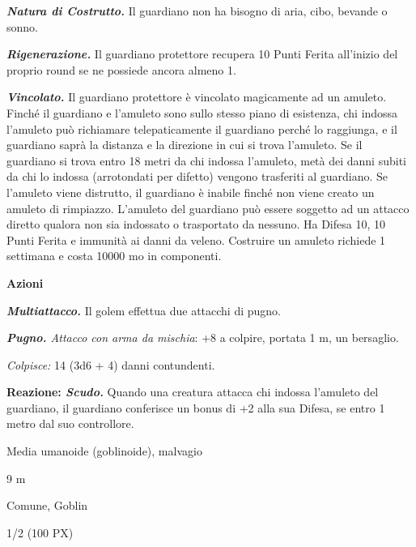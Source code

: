 \begin{multicols}{2}
{\emph{\textbf{Natura di Costrutto.}} Il guardiano non ha bisogno di aria, cibo, bevande o sonno.

\emph{\textbf{Rigenerazione.}} Il guardiano protettore recupera 10 Punti Ferita all'inizio del proprio round se ne possiede ancora almeno 1.

\emph{\textbf{Vincolato.}} Il guardiano protettore è vincolato magicamente ad un amuleto. Finché il guardiano e l'amuleto sono sullo stesso piano di esistenza, chi indossa l'amuleto può richiamare telepaticamente il guardiano perché lo raggiunga, e il guardiano saprà la distanza e la direzione in cui si trova l'amuleto. Se il guardiano si trova entro 18 metri da chi indossa l'amuleto, metà dei danni subiti da chi lo indossa (arrotondati per difetto) vengono trasferiti al guardiano. Se l'amuleto viene distrutto, il guardiano è inabile finché non viene creato un amuleto di rimpiazzo. L'amuleto del guardiano può essere soggetto ad un attacco diretto qualora non sia indossato o trasportato da nessuno. Ha Difesa 10, 10 Punti Ferita e immunità ai danni da veleno. Costruire un amuleto richiede 1 settimana e costa 10000 mo in componenti.

\textbf{Azioni}

\emph{\textbf{Multiattacco.}} Il golem effettua due attacchi di pugno.

\emph{\textbf{Pugno.} Attacco con arma da mischia}: +8 a colpire, portata 1 m, un bersaglio.

\emph{Colpisce:} 14 (3d6 + 4) danni contundenti.

\textbf{Reazione: \emph{Scudo.}} Quando una creatura attacca chi indossa l'amuleto del guardiano, il guardiano conferisce un bonus di +2 alla sua Difesa, se entro 1 metro dal suo controllore.


\begin{description}[noitemsep, topsep=0pt, parsep=0pt, partopsep=0pt, itemsep=1pt, leftmargin=2.35cm,  labelwidth=2.2cm, itemindent=0cm, listparindent=0pt] %
\setlength{\baselineskip}{10pt}
\item[\textbf{Taglia/Tipo}] Media umanoide (goblinoide), malvagio
\item[\textbf{Caratt.}] 
\item[\textbf{Punti Ferita}] 
\item[\textbf{Movimento}] 9 m
\item[\textbf{Tiri Salvez.}] 
\item[\textbf{Sensi}] 
\item[\textbf{Linguaggi}] Comune, Goblin
\item[\textbf{Sfida}] 1/2 (100 PX)
\end{description}
\smallskip

}
\end{multicols}
